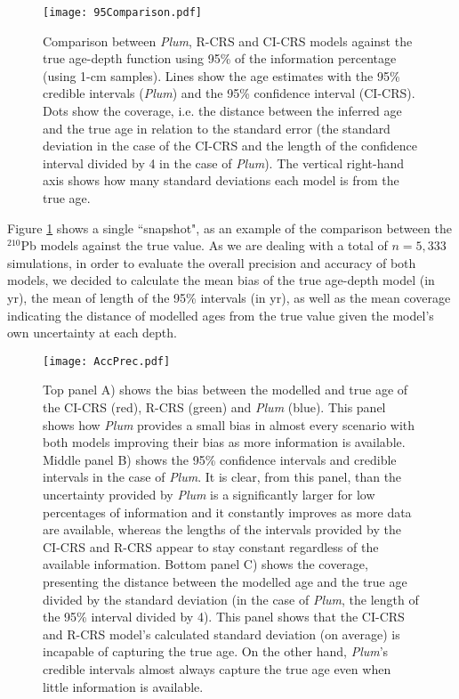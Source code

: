 \documentclass [10pt] {article}
\begin{document}
\begin{figure}[!]
	\centering
	\texttt{[image: 95Comparison.pdf]}
		\caption{Comparison between \textit{Plum}, R-CRS and CI-CRS models against the true age-depth function using 95\% of the information percentage (using 1-cm samples). Lines show the age estimates with the 95\% credible intervals (\textit{Plum}) and the 95\% confidence interval (CI-CRS). Dots show the coverage, i.e. the distance between the inferred age and the true age in relation to the standard error (the standard deviation in the case of the CI-CRS and the length of the confidence interval divided by 4 in the case of \textit{Plum}). The vertical right-hand axis shows how many standard deviations each model is from the true age.  }
		\label{fig:comparison1r}
\end{figure}

Figure \ref{fig:comparison1r} shows a single ``snapshot", as an example of the comparison between the $^{210}$Pb models against the true value. 
As we are dealing with a total of $n = 5,333$ simulations, in order to evaluate the overall precision and accuracy of both models, we decided to calculate the mean bias of the true age-depth model (in yr), the mean of length of the 95\% intervals (in yr), as well as the mean coverage indicating the distance of modelled ages from the true value given the model's own uncertainty at each depth.  

\begin{figure}[!]
 \centering
  \texttt{[image: AccPrec.pdf]}
	\caption{Top panel A) shows the bias between the modelled and true age of the CI-CRS (red), R-CRS (green) and \textit{Plum} (blue). This panel shows how \textit{Plum} provides a small bias in almost every scenario with both models improving their bias as more information is available. Middle panel B) shows the 95\% confidence intervals and credible intervals in the case of \textit{Plum}. It is clear, from this panel, than the uncertainty provided by \textit{Plum} is a significantly larger for low percentages of information and it constantly improves as more data are available, whereas the lengths of the intervals provided by the CI-CRS and R-CRS appear to stay constant regardless of the available information. Bottom panel C) shows the coverage, presenting the distance between the modelled age and the true age divided by the standard deviation (in the case of \textit{Plum}, the length of the 95\% interval divided by 4). This panel shows that the CI-CRS and R-CRS model's calculated standard deviation (on average) is incapable of capturing the true age. On the other hand, \textit{Plum}'s credible intervals almost always capture the true age even when little information is available.}
  \label{fig:accpre}
\end{figure}
\end{document}
